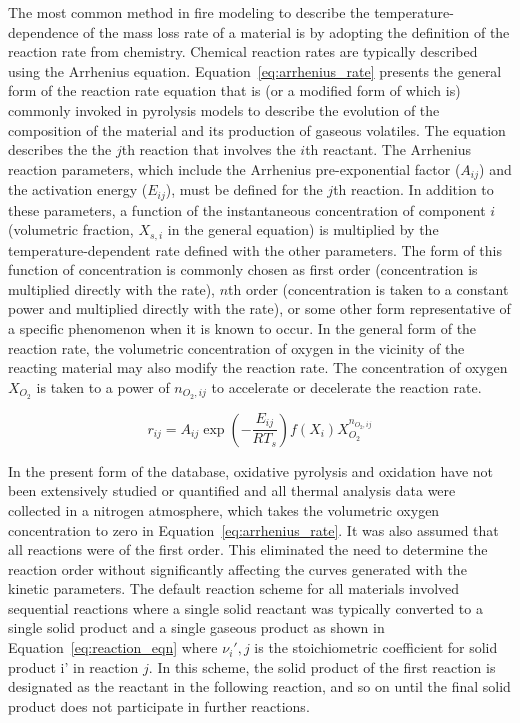 \documentclass[12pt,oneside]{book}
\begin{document}
The most common method in fire modeling to describe the temperature-dependence of the mass loss rate of a material is by adopting the definition of the reaction rate from chemistry. Chemical reaction rates are typically described using the Arrhenius equation. Equation~\ref{eq:arrhenius_rate} presents the general form of the reaction rate equation that is (or a modified form of which is) commonly invoked in pyrolysis models to describe the evolution of the composition of the material and its production of gaseous volatiles. The equation describes the the $j$th reaction that involves the $i$th reactant. The Arrhenius reaction parameters, which include the Arrhenius pre-exponential factor ($A_{ij}$) and the activation energy ($E_{ij}$), must be defined for the $j$th reaction. In addition to these parameters, a function of the instantaneous concentration of component $i$ (volumetric fraction, $X_{s,i}$ in the general equation) is multiplied by the temperature-dependent rate defined with the other parameters. The form of this function of concentration is commonly chosen as first order (concentration is multiplied directly with the rate), $n$th order (concentration is taken to a constant power and multiplied directly with the rate), or some other form representative of a specific phenomenon when it is known to occur. In the general form of the reaction rate, the volumetric concentration of oxygen in the vicinity of the reacting material may also modify the reaction rate. The concentration of oxygen $X_{O_2}$ is taken to a power of $n_{O_2,ij}$ to accelerate or decelerate the reaction rate. 

\begin{equation}
r_{ij} = A_{ij}\exp\left(-\frac{E_{ij}}{RT_s}\right)f(X_{i})X_{O_2}^{n_{O_2,ij}}\label{eq:arrhenius_rate}
\end{equation}

In the present form of the database, oxidative pyrolysis and oxidation have not been extensively studied or quantified and all thermal analysis data were collected in a nitrogen atmosphere, which takes the volumetric oxygen concentration to zero in Equation~\ref{eq:arrhenius_rate}. It was also assumed that all reactions were of the first order. This eliminated the need to determine the reaction order without significantly affecting the curves generated with the kinetic parameters. The default reaction scheme for all materials involved sequential reactions where a single solid reactant was typically converted to a single solid product and a single gaseous product as shown in Equation~\ref{eq:reaction_eqn} where $\nu_i',j$ is the stoichiometric coefficient for solid product i' in reaction $j$. In this scheme, the solid product of the first reaction is designated as the reactant in the following reaction, and so on until the final solid product does not participate in further reactions. 
\end{document}
